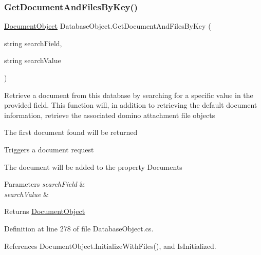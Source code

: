 \subsubsection{\texorpdfstring{Get\+Document\+And\+Files\+By\+Key()}{GetDocumentAndFilesByKey()}}
{\footnotesize\ttfamily \mbox{\hyperlink{class_document_object}{Document\+Object}} Database\+Object.\+Get\+Document\+And\+Files\+By\+Key (\begin{DoxyParamCaption}\item[{string}]{search\+Field,  }\item[{string}]{search\+Value }\end{DoxyParamCaption})}



Retrieve a document from this database by searching for a specific value in the provided field. This function will, in addition to retrieving the default document information, retrieve the associated domino attachment file objects 

The first document found will be returned

Triggers a document request

The document will be added to the property \textquotesingle{}Documents\textquotesingle{}


\begin{DoxyParams}{Parameters}
{\em search\+Field} & \\
\hline
{\em search\+Value} & \\
\hline
\end{DoxyParams}
\begin{DoxyReturn}{Returns}
\mbox{\hyperlink{class_document_object}{Document\+Object}}
\end{DoxyReturn}


Definition at line 278 of file Database\+Object.\+cs.



References Document\+Object.\+Initialize\+With\+Files(), and Is\+Initialized.


